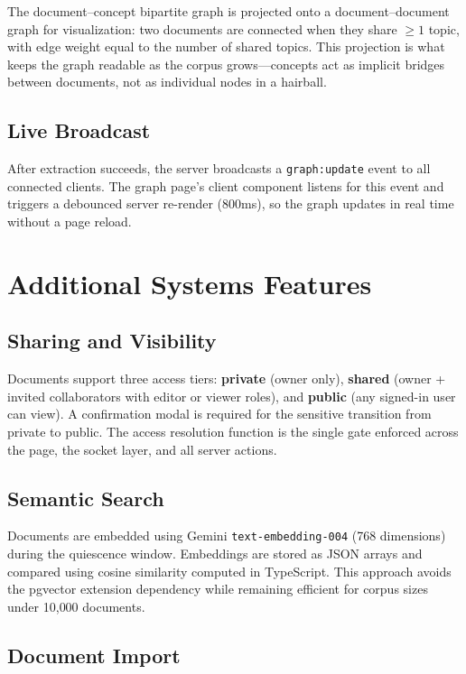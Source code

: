 \documentclass[conference]{IEEEtran}
\begin{document}
The document--concept bipartite graph is projected onto a document--document graph for visualization: two documents are connected when they share $\geq 1$ topic, with edge weight equal to the number of shared topics. This projection is what keeps the graph readable as the corpus grows---concepts act as implicit bridges between documents, not as individual nodes in a hairball.

\subsection{Live Broadcast}

After extraction succeeds, the server broadcasts a \texttt{graph:update} event to all connected clients. The graph page's client component listens for this event and triggers a debounced server re-render (800ms), so the graph updates in real time without a page reload.

\section{Additional Systems Features}\label{sec:features}

\subsection{Sharing and Visibility}

Documents support three access tiers: \textbf{private} (owner only), \textbf{shared} (owner + invited collaborators with editor or viewer roles), and \textbf{public} (any signed-in user can view). A confirmation modal is required for the sensitive transition from private to public. The access resolution function is the single gate enforced across the page, the socket layer, and all server actions.

\subsection{Semantic Search}

Documents are embedded using Gemini \texttt{text-embedding-004} (768 dimensions) during the quiescence window. Embeddings are stored as JSON arrays and compared using cosine similarity computed in TypeScript. This approach avoids the pgvector extension dependency while remaining efficient for corpus sizes under 10{,}000 documents.

\subsection{Document Import}
\end{document}
